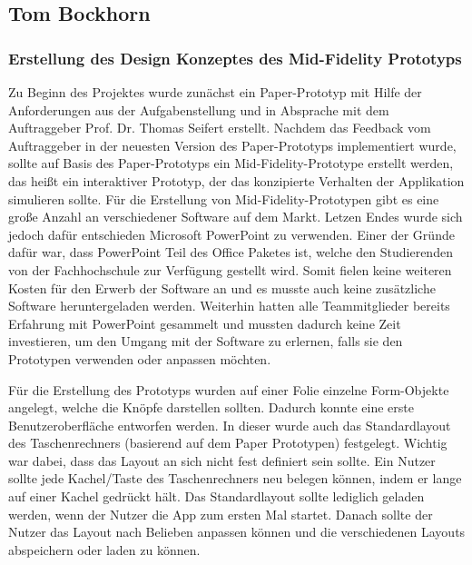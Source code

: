 \subsection{Tom Bockhorn}


\subsubsection{Erstellung des Design Konzeptes des Mid-Fidelity Prototyps }
\label{subsubsection:erstellung-des-design-konzeptes-des-mid-fidelity}

Zu Beginn des Projektes wurde zunächst ein Paper-Prototyp mit Hilfe der Anforderungen aus der Aufgabenstellung und in Absprache mit dem Auftraggeber Prof. Dr. Thomas Seifert erstellt. Nachdem das Feedback vom Auftraggeber in der neuesten Version des Paper-Prototyps implementiert wurde, sollte auf Basis des Paper-Prototyps ein Mid-Fidelity-Prototype erstellt werden, das heißt ein interaktiver Prototyp, der das konzipierte Verhalten der Applikation simulieren sollte. Für die Erstellung von Mid-Fidelity-Prototypen gibt es eine große Anzahl an verschiedener Software auf dem Markt. Letzen Endes wurde sich jedoch dafür entschieden Microsoft PowerPoint zu verwenden. Einer der Gründe dafür war, dass PowerPoint Teil des Office Paketes ist, welche den Studierenden von der Fachhochschule zur Verfügung gestellt wird. Somit fielen keine weiteren Kosten für den Erwerb der Software an und es musste auch keine zusätzliche Software heruntergeladen werden. Weiterhin hatten alle Teammitglieder bereits Erfahrung mit PowerPoint gesammelt und mussten dadurch keine Zeit investieren, um den Umgang mit der Software zu erlernen, falls sie den Prototypen verwenden oder anpassen möchten.  

Für die Erstellung des Prototyps wurden auf einer Folie einzelne Form-Objekte angelegt, welche die Knöpfe darstellen sollten. Dadurch konnte eine erste Benutzeroberfläche entworfen werden. In dieser wurde auch das Standardlayout des Taschenrechners (basierend auf dem Paper Prototypen) festgelegt. Wichtig war dabei, dass das Layout an sich nicht fest definiert sein sollte. Ein Nutzer sollte jede Kachel/Taste des Taschenrechners neu belegen können, indem er lange auf einer Kachel gedrückt hält. Das Standardlayout sollte lediglich geladen werden, wenn der Nutzer die App zum ersten Mal startet. Danach sollte der Nutzer das Layout nach Belieben anpassen können und die verschiedenen Layouts abspeichern oder laden zu können.  

